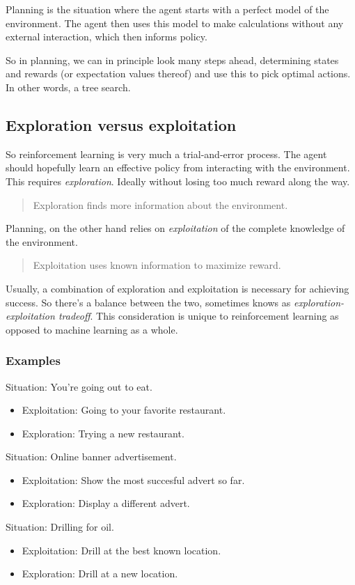 \documentclass[12pt, a4paper]{article}
\numberwithin{equation}{section}
\begin{document}
Planning is the situation where the agent starts with a perfect model of the environment. The agent then uses this model to make calculations without any external interaction, which then informs policy.

So in planning, we can in principle look many steps ahead, determining states and rewards (or expectation values thereof) and use this to pick optimal actions. In other words, a tree search.

\subsection{Exploration versus exploitation}
So reinforcement learning is very much a trial-and-error process. The agent should hopefully learn an effective policy from interacting with the environment. This requires \textit{exploration}. Ideally without losing too much reward along the way.

\begin{quotation}
Exploration finds more information about the environment.
\end{quotation}

Planning, on the other hand relies on \textit{exploitation} of the complete knowledge of the environment.

\begin{quotation}
Exploitation uses known information to maximize reward.
\end{quotation}

Usually, a combination of exploration and exploitation is necessary for achieving success. So there's a balance between the two, sometimes knows as \textit{exploration-exploitation tradeoff}. This consideration is unique to reinforcement learning as opposed to machine learning as a whole.

\subsubsection{Examples}
Situation: You're going out to eat.
\begin{itemize}
\item Exploitation: Going to your favorite restaurant.
\item Exploration: Trying a new restaurant.
\end{itemize}
Situation: Online banner advertisement.
\begin{itemize}
\item Exploitation: Show the most succesful advert so far.
\item Exploration: Display a different advert.
\end{itemize}
Situation: Drilling for oil.
\begin{itemize}
\item Exploitation: Drill at the best known location.
\item Exploration: Drill at a new location.
\end{itemize}
\end{document}

